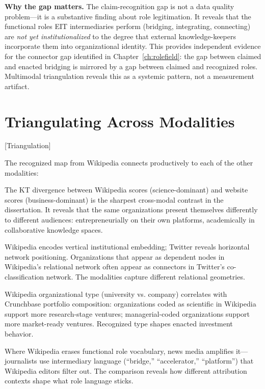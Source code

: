 \documentclass[../main.tex]{subfiles}
\begin{document}
\begin{importantbox}
\textbf{Why the gap matters.} The claim-recognition gap is not a data quality problem---it is a substantive finding about role legitimation. It reveals that the functional roles EIT intermediaries perform (bridging, integrating, connecting) are \emph{not yet institutionalized} to the degree that external knowledge-keepers incorporate them into organizational identity. This provides independent evidence for the connector gap identified in Chapter~\ref{ch:rolefield}: the gap between claimed and enacted bridging is mirrored by a gap between claimed and recognized roles. Multimodal triangulation reveals this as a systemic pattern, not a measurement artifact.
\end{importantbox}


\section{Triangulating Across Modalities}[Triangulation]

The recognized map from Wikipedia connects productively to each of the other modalities:

\begin{description}[leftmargin=0.5cm, itemsep=0.3em]
\item[Website Cartography (Ch.~\ref{ch:interstitial}).] The KT divergence between Wikipedia scores (science-dominant) and website scores (business-dominant) is the sharpest cross-modal contrast in the dissertation. It reveals that the same organizations present themselves differently to different audiences: entrepreneurially on their own platforms, academically in collaborative knowledge spaces.

\item[Twitter Cartography (Ch.~\ref{ch:rolefield}).] Wikipedia encodes vertical institutional embedding; Twitter reveals horizontal network positioning. Organizations that appear as dependent nodes in Wikipedia's relational network often appear as connectors in Twitter's co-classification network. The modalities capture different relational geometries.

\item[Crunchbase Cartography (Ch.~\ref{ch:venture}).] Wikipedia organizational type (university vs. company) correlates with Crunchbase portfolio composition: organizations coded as scientific in Wikipedia support more research-stage ventures; managerial-coded organizations support more market-ready ventures. Recognized type shapes enacted investment behavior.

\item[News Cartography (Ch.~\ref{ch:power}).] Where Wikipedia erases functional role vocabulary, news media amplifies it---journalists use intermediary language (``bridge,'' ``accelerator,'' ``platform'') that Wikipedia editors filter out. The comparison reveals how different attribution contexts shape what role language sticks.
\end{description}
\end{document}
